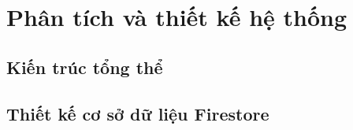 
\chapter{Phân tích và thiết kế hệ thống}
\label{ch:thiet-ke}


\section{Kiến trúc tổng thể}
\label{sec:kien-truc}

\section{Thiết kế cơ sở dữ liệu Firestore}
\label{sec:db-design}

